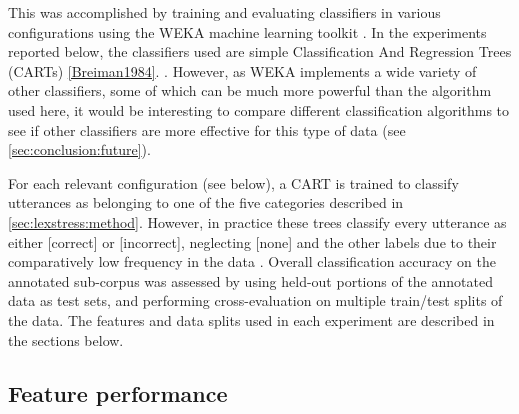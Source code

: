 		This was accomplished by training and evaluating classifiers in various configurations using the WEKA machine learning toolkit \citep{Hall2009}. 	
		In the experiments reported below, 
		the classifiers used are
		simple Classification And Regression Trees (CARTs) \cref{Breiman1984}. 
		. 
		However, as WEKA implements a wide variety of other classifiers, some of which can be much more powerful than the algorithm used here, it would be interesting to compare different classification algorithms to see if other classifiers are more effective for this type of data (see \cref{sec:conclusion:future}).
		
		For each relevant configuration (see below), a CART is trained to classify utterances as belonging to one of the five categories described in \cref{sec:lexstress:method}. However, in practice these trees classify every utterance as either [correct] or [incorrect], neglecting [none] and the other labels due to their comparatively low frequency in the data .
		Overall classification accuracy on the annotated sub-corpus was assessed by using held-out portions of the annotated data as test sets, and performing cross-evaluation on multiple train/test splits of the data. The features and data splits used in each experiment are described in the sections below. 

		
	\subsection{Feature performance }
	\label{sec:classification:features}
		

